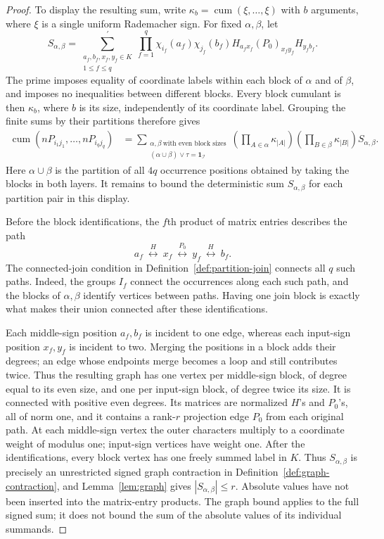 \documentclass[11pt]{article}
\theoremstyle{definition}
\theoremstyle{remark}
\theoremstyle{plain}
\newcommand{\one}{\mathbf 1}
\DeclareMathOperator{\cum}{cum}
\begin{document}
\begin{proof}
To display the resulting sum, write
$\kappa_b=\cum(\xi,\ldots,\xi)$ with $b$ arguments, where $\xi$
is a single uniform Rademacher sign. For fixed $\alpha,\beta$, let
\[
 S_{\alpha,\beta}
 =\sum_{\substack{a_f,b_f,x_f,y_f\in K\\1\le f\le q}}^{\prime}
   \prod_{f=1}^q
   \chi_{i_f}(a_f)\chi_{j_f}(b_f)
   H_{a_fx_f}(P_0)_{x_fy_f}H_{y_fb_f}.
\]
The prime imposes equality of coordinate labels within each block
of $\alpha$ and of $\beta$, and imposes no inequalities between
different blocks. Every block cumulant is then $\kappa_b$, where
$b$ is its size, independently of its coordinate label. Grouping
the finite sums by their partitions therefore gives
\[
 \begin{aligned}
 \cum(nP_{i_1j_1},\ldots,nP_{i_qj_q})
 &=\sum_{\substack{\alpha,\beta\ \text{with even block sizes}\\
             (\alpha\cup\beta)\vee\tau=\one_{\mathcal I}}}
   \left(\prod_{A\in\alpha}\kappa_{|A|}\right)
   \left(\prod_{B\in\beta}\kappa_{|B|}\right)
   S_{\alpha,\beta}.
 \end{aligned}
\]
Here $\alpha\cup\beta$ is the partition of all $4q$ occurrence
positions obtained by taking the blocks in both layers. It remains to
bound the deterministic sum $S_{\alpha,\beta}$ for each partition
pair in this display.

Before the block identifications, the $f$th product of matrix
entries describes the path
\[
 a_f\ \overset{H}{\longleftrightarrow}\ x_f
 \ \overset{P_0}{\longleftrightarrow}\ y_f
 \ \overset{H}{\longleftrightarrow}\ b_f.
\]
The connected-join condition in
Definition~\ref{def:partition-join} connects all $q$ such paths.
Indeed, the groups $I_f$ connect the occurrences
along each such path, and the blocks of $\alpha,\beta$ identify
vertices between paths. Having one join block is exactly what
makes their union connected after these identifications.

Each middle-sign position $a_f,b_f$ is incident to one edge, whereas
each input-sign position $x_f,y_f$ is incident to two. Merging the
positions in a block adds their degrees; an edge whose endpoints
merge becomes a loop and still contributes twice. Thus the resulting
graph has one vertex per middle-sign block, of degree equal to its
even size, and one per input-sign block, of degree twice its size.
It is connected with positive even degrees. Its matrices are
normalized \(H\)'s and \(P_0\)'s, all of norm one, and it contains
a rank-$r$ projection edge $P_0$ from each original path.
At each middle-sign vertex the outer characters multiply to a
coordinate weight of modulus one; input-sign vertices have weight one.
After the identifications, every block vertex has one freely summed
label in $K$. Thus $S_{\alpha,\beta}$ is precisely an unrestricted
signed graph contraction in Definition~\ref{def:graph-contraction},
and Lemma~\ref{lem:graph} gives $|S_{\alpha,\beta}|\le r$.
Absolute values have not been inserted into the matrix-entry products.
The graph bound applies to the full signed sum; it does not bound
the sum of the absolute values of its individual summands.


\end{proof}
\end{document}
